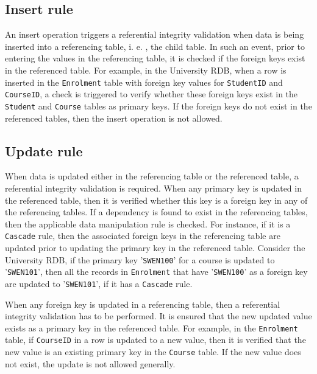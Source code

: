 \subsection{Insert rule}
		An insert operation triggers a referential integrity
		validation when data is being inserted into a referencing table,   i. e. ,   the
		child table.  In such an event,   prior to entering the values in the
		referencing table,   it is checked if the foreign keys exist in the referenced
		table.  For example,   in the University \ac{RDB},   when a row is inserted in
		the \texttt{Enrolment} table with foreign key values for \texttt{StudentID} and
		\texttt{CourseID},   a check is triggered to verify whether these foreign keys
		exist in the \texttt{Student} and \texttt{Course} tables as primary keys.  If
		the foreign keys do not exist in the referenced tables,   then the insert
		operation is not allowed.
		
\subsection{Update rule}
 When data is updated either in the referencing table or the
		referenced table,   a referential integrity validation is required.  When any
		primary key is updated in the referenced table, then it is verified whether this
		key is a foreign key in any of the referencing tables.  If a dependency is found
		to exist in the referencing tables,   then the applicable data manipulation
		rule is checked.
		For instance,   if it is a \texttt{Cascade} rule,   then the associated foreign keys
		in the referencing table are updated prior to updating the primary key in the
		referenced table.  Consider the University \ac{RDB}, if the primary key
		'\texttt{SWEN100}' for a course is updated to '\texttt{SWEN101}',   then all the records in
		\texttt{Enrolment} that have '\texttt{SWEN100}' as a foreign key are
		updated to '\texttt{SWEN101}', if it has a \texttt{Cascade} rule.
		
		When any foreign key is  updated in a referencing table,   then a
		referential integrity validation has to be performed.  It is ensured that the
		new updated value exists as a primary key in the referenced table.  For example,
		  in the \texttt{Enrolment} table,   if \texttt{CourseID} in a row is updated to
		a new value,   then it is verified that the new value is an existing primary key
		in the \texttt{Course} table.  If the new value does not exist,   the update is
		not allowed generally.
		
